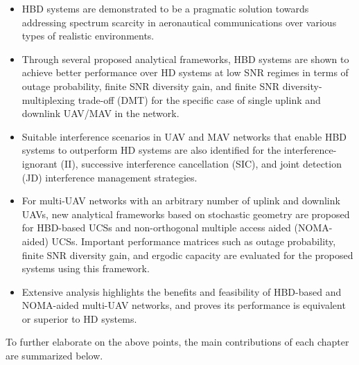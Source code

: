 \begin{itemize}
	\item HBD systems are demonstrated to be a pragmatic solution towards addressing spectrum scarcity in aeronautical communications over various types of realistic environments.
	\item Through several proposed analytical frameworks, HBD systems are shown to achieve better performance over HD systems at low SNR regimes in terms of outage probability, finite SNR diversity gain, and finite SNR diversity-multiplexing trade-off (DMT) for the specific case of single uplink and downlink UAV/MAV in the network.
	\item Suitable interference scenarios in UAV and MAV networks that enable HBD systems to outperform HD systems are also identified for the interference-ignorant (II), successive interference cancellation (SIC), and joint detection (JD) interference management strategies.
	\item For multi-UAV networks with an arbitrary number of uplink and downlink UAVs, new analytical frameworks based on stochastic geometry are proposed for HBD-based UCSs and non-orthogonal multiple access aided (NOMA-aided) UCSs. Important performance matrices such as outage probability, finite SNR diversity gain, and ergodic capacity are evaluated for the proposed systems using this framework.
	\item Extensive analysis highlights the benefits and feasibility of HBD-based and NOMA-aided multi-UAV networks, and proves its performance is equivalent or superior to HD systems.
\end{itemize}


To further elaborate on the above points, the main contributions of each chapter are summarized below.

